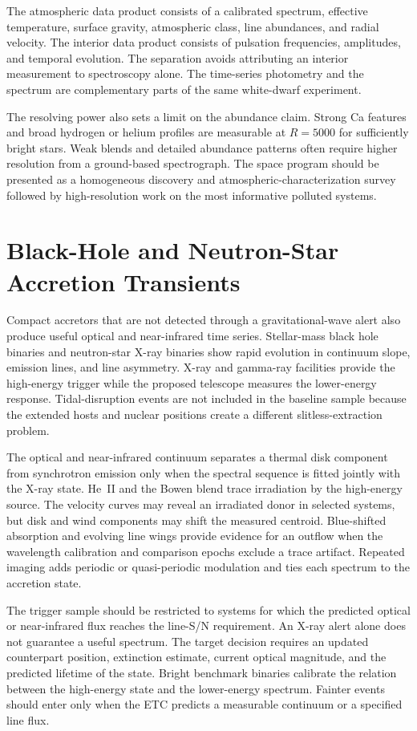 \documentclass[10pt,onecolumn]{article}
\begin{document}
The atmospheric data product consists of a calibrated spectrum, effective
temperature, surface gravity, atmospheric class, line abundances, and radial
velocity. The interior data product consists of pulsation frequencies, amplitudes,
and temporal evolution. The separation avoids attributing an interior
measurement to spectroscopy alone. The time-series photometry and the
spectrum are complementary parts of the same white-dwarf experiment.

The resolving power also sets a limit on the abundance claim. Strong Ca
features and broad hydrogen or helium profiles are measurable at $R=5000$ for
sufficiently bright stars. Weak blends and detailed abundance patterns often
require higher resolution from a ground-based spectrograph. The space program
should be presented as a homogeneous discovery and atmospheric-characterization
survey followed by high-resolution work on the most informative polluted
systems.

\section{Black-Hole and Neutron-Star Accretion Transients}

Compact accretors that are not detected through a gravitational-wave alert
also produce useful optical and near-infrared time series. Stellar-mass black
hole binaries and neutron-star X-ray binaries show rapid evolution in
continuum slope, emission lines, and line asymmetry. X-ray and gamma-ray
facilities provide the high-energy trigger while the proposed telescope
measures the lower-energy response. Tidal-disruption events are not included
in the baseline sample because the extended hosts and nuclear positions
create a different slitless-extraction problem.

The optical and near-infrared continuum separates a thermal disk component
from synchrotron emission only when the spectral sequence is fitted jointly with
the X-ray state. He~II and the Bowen blend trace irradiation by the
high-energy source. The velocity curves may reveal an irradiated donor in
selected systems, but disk and wind components may shift the measured
centroid. Blue-shifted absorption and evolving line wings provide evidence for
an outflow when the wavelength calibration and comparison epochs exclude a
trace artifact. Repeated imaging adds periodic or quasi-periodic modulation
and ties each spectrum to the accretion state.

The trigger sample should be restricted to systems for which the predicted
optical or near-infrared flux reaches the line-S/N requirement. An X-ray alert
alone does not guarantee a useful spectrum. The target decision requires an
updated counterpart position, extinction estimate, current optical magnitude,
and the predicted lifetime of the state. Bright benchmark binaries
calibrate the relation between the high-energy state and the lower-energy
spectrum. Fainter events should enter only when the ETC predicts a measurable
continuum or a specified line flux.
\end{document}
